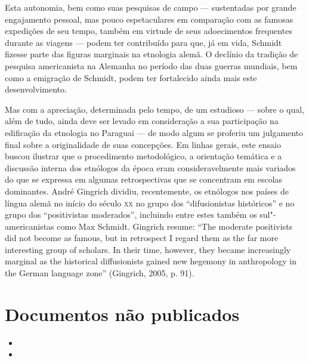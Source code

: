 Esta autonomia, bem como suas pesquisas de campo --- sustentadas por
grande engajamento pessoal, mas pouco espetaculares em comparação com
as famosas expedições de seu tempo, também em virtude de seus
adoecimentos frequentes durante as viagens --- podem ter contribuído para
que, já em vida, Schmidt fizesse parte das figuras marginais na
etnologia alemã. O declínio da tradição de pesquisa americanista na
Alemanha no período das duas guerras mundiais, bem como a emigração de
Schmidt, podem ter fortalecido ainda mais este desenvolvimento.

Mas com a apreciação, determinada pelo tempo, de um estudioso --- sobre o
qual, além de tudo, ainda deve ser levado em consideração a sua
participação na edificação da etnologia no Paraguai --- de modo algum se
proferiu um julgamento final sobre a originalidade de suas concepções.
Em linhas gerais, este ensaio buscou ilustrar que o procedimento
metodológico, a orientação temática e a discussão interna dos etnólogos
da época eram consideravelmente mais variados do que se expressa em
algumas retrospectivas que se concentram em escolas dominantes. André
Gingrich dividiu, recentemente, os etnólogos nos países de língua alemã
no início do século \textsc{xx} no grupo dos ``difusionistas históricos'' e no
grupo dos ``positivistas moderados'', incluindo entre estes também os
sul"-americanistas como Max Schmidt. Gingrich resume: ``The moderate
positivists did not become as famous, but in retrospect I regard them as
the far more interesting group of scholars. In their time, however, they
became increasingly marginal as the historical diffusionists gained new
hegemony in anthropology in the German language zone'' (Gingrich, 2005,
p. 91).

\section{Documentos não publicados}

\begin{itemize}
\item[]

\item[]
\end{itemize}


